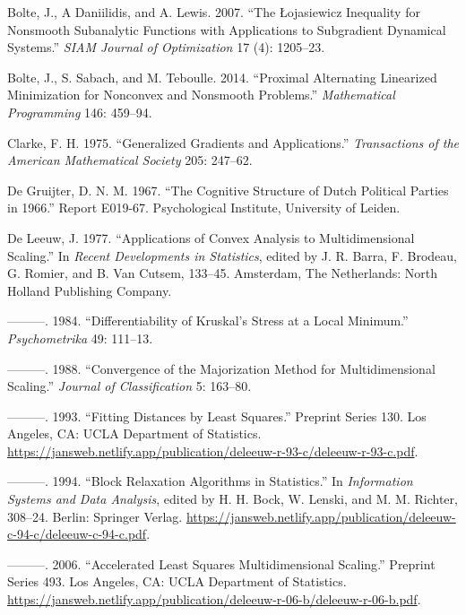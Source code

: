 \documentclass[
  12pt,
]{article}
\newlength{\cslhangindent}
\newenvironment{CSLReferences}[2] %
 {\begin{list}{}{%
  \setlength{\itemindent}{0pt}
  \setlength{\leftmargin}{0pt}
  \setlength{\parsep}{0pt}
  \ifodd #1
   \setlength{\leftmargin}{\cslhangindent}
   \setlength{\itemindent}{-1\cslhangindent}
  \fi
  \setlength{\itemsep}{#2\baselineskip}}}
 {\end{list}}
\begin{document}
\label{refs}
\begin{CSLReferences}{1}{0}
Bolte, J., A Daniilidis, and A. Lewis. 2007. {``The {Ł}ojasiewicz Inequality for Nonsmooth Subanalytic Functions with Applications to Subgradient Dynamical Systems.''} \emph{SIAM Journal of Optimization} 17 (4): 1205--23.

Bolte, J., S. Sabach, and M. Teboulle. 2014. {``Proximal Alternating Linearized Minimization for Nonconvex and Nonsmooth Problems.''} \emph{Mathematical Programming} 146: 459--94.

Clarke, F. H. 1975. {``Generalized Gradients and Applications.''} \emph{Transactions of the American Mathematical Society} 205: 247--62.

De Gruijter, D. N. M. 1967. {``{The Cognitive Structure of Dutch Political Parties in 1966}.''} Report E019-67. Psychological Institute, University of Leiden.

De Leeuw, J. 1977. {``Applications of Convex Analysis to Multidimensional Scaling.''} In \emph{Recent Developments in Statistics}, edited by J. R. Barra, F. Brodeau, G. Romier, and B. Van Cutsem, 133--45. Amsterdam, The Netherlands: North Holland Publishing Company.

---------. 1984. {``{Differentiability of Kruskal's Stress at a Local Minimum}.''} \emph{Psychometrika} 49: 111--13.

---------. 1988. {``Convergence of the Majorization Method for Multidimensional Scaling.''} \emph{Journal of Classification} 5: 163--80.

---------. 1993. {``Fitting Distances by Least Squares.''} Preprint Series 130. Los Angeles, CA: UCLA Department of Statistics. \url{https://jansweb.netlify.app/publication/deleeuw-r-93-c/deleeuw-r-93-c.pdf}.

---------. 1994. {``{Block Relaxation Algorithms in Statistics}.''} In \emph{Information Systems and Data Analysis}, edited by H. H. Bock, W. Lenski, and M. M. Richter, 308--24. Berlin: Springer Verlag. \url{https://jansweb.netlify.app/publication/deleeuw-c-94-c/deleeuw-c-94-c.pdf}.

---------. 2006. {``{Accelerated Least Squares Multidimensional Scaling}.''} Preprint Series 493. Los Angeles, CA: UCLA Department of Statistics. \url{https://jansweb.netlify.app/publication/deleeuw-r-06-b/deleeuw-r-06-b.pdf}.


\end{CSLReferences}
\end{document}

